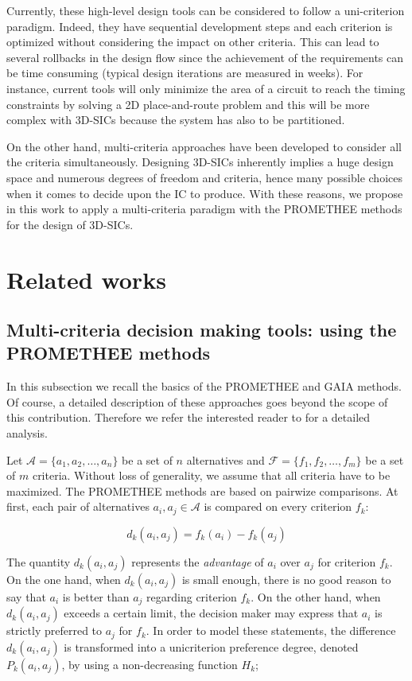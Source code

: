 \documentclass{svmult}
\begin{document}
Currently, these high-level design tools can be considered to follow a uni-criterion paradigm. Indeed, they have sequential development steps and each criterion is optimized without considering the impact on other criteria. This can lead to several rollbacks in the design flow since the achievement of the requirements can be time consuming (typical design iterations are measured in weeks). For instance, current tools will only minimize the area of a circuit to reach the timing constraints by solving a 2D place-and-route problem and this will be more complex with 3D-SICs because the system has also to be partitioned.

On the other hand, multi-criteria approaches have been developed to consider all the criteria simultaneously. Designing 3D-SICs inherently implies a huge design space and numerous degrees of freedom and criteria, hence many possible choices when it comes to decide upon the IC to produce. With these reasons, we propose in this work to apply a multi-criteria paradigm with the PROMETHEE methods for the design of 3D-SICs.

\section{Related works}

\subsection{Multi-criteria decision making tools: using the PROMETHEE methods}

In this subsection we recall the basics of the PROMETHEE and GAIA methods. Of course, a detailed description of these approaches goes beyond the scope of this contribution. Therefore we refer the interested reader to \cite{BraMar2005} for a detailed analysis.

Let $\mathcal{A}=\{a_1,a_2,\ldots,a_n\}$ be a set of $n$ alternatives and $\mathcal{F}=\{f_1,f_2,\ldots,f_m\}$ be a set of $m$ criteria. Without loss of generality, we assume that all criteria have to be maximized. The PROMETHEE methods are based on pairwize comparisons. At first, each pair of alternatives $a_i,a_j \in \mathcal{A}$ is compared on every criterion $f_k$:

$$
d_k(a_i,a_j) = f_k(a_i) - f_k(a_j)
$$

The quantity $d_k(a_i,a_j)$ represents the \textit{advantage} of $a_i$ over $a_j$ for criterion $f_k$. On the one hand, when $d_k(a_i,a_j)$ is small enough, there is no good reason to say that $a_i$ is better than $a_j$ regarding criterion $f_k$. On the other hand, when $d_k(a_i,a_j)$ exceeds a certain limit, the decision maker may express that $a_i$ is strictly preferred to $a_j$ for $f_k$. In order to model these statements, the difference $d_k(a_i,a_j)$ is transformed into a unicriterion preference degree, denoted $ P_k(a_i,a_j)$, by using a non-decreasing function $H_k$;
\end{document}
